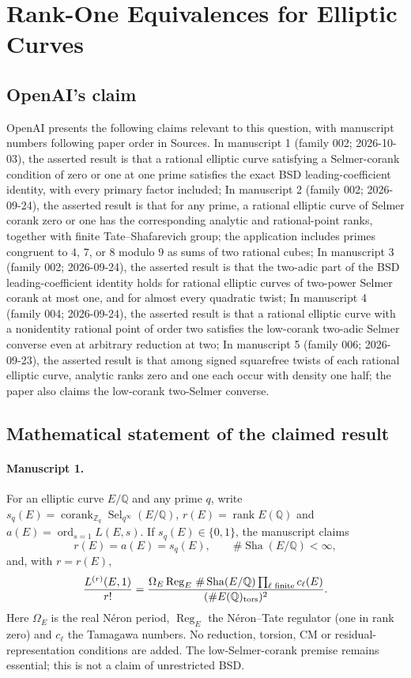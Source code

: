 \documentclass[11pt]{article}
\begin{document}
\section*{Rank-One Equivalences for Elliptic Curves}

\subsection{OpenAI's claim}
OpenAI presents the following claims relevant to this question, with manuscript numbers following paper order in Sources. In manuscript 1 (family 002; 2026-10-03), the asserted result is that a rational elliptic curve satisfying a Selmer-corank condition of zero or one at one prime satisfies the exact BSD leading-coefficient identity, with every primary factor included; In manuscript 2 (family 002; 2026-09-24), the asserted result is that for any prime, a rational elliptic curve of Selmer corank zero or one has the corresponding analytic and rational-point ranks, together with finite Tate--Shafarevich group; the application includes primes congruent to $4$, $7$, or $8$ modulo $9$ as sums of two rational cubes; In manuscript 3 (family 002; 2026-09-24), the asserted result is that the two-adic part of the BSD leading-coefficient identity holds for rational elliptic curves of two-power Selmer corank at most one, and for almost every quadratic twist; In manuscript 4 (family 004; 2026-09-24), the asserted result is that a rational elliptic curve with a nonidentity rational point of order two satisfies the low-corank two-adic Selmer converse even at arbitrary reduction at two; In manuscript 5 (family 006; 2026-09-23), the asserted result is that among signed squarefree twists of each rational elliptic curve, analytic ranks zero and one each occur with density one half; the paper also claims the low-corank two-Selmer converse.

\subsection{Mathematical statement of the claimed result}
\paragraph{Manuscript 1.}
For an elliptic curve $E/\mathbb Q$ and any prime $q$, write $s_q(E)=\operatorname{corank}_{\mathbb Z_q}\operatorname{Sel}_{q^{\infty}}(E/\mathbb Q)$, $r(E)=\operatorname{rank}E(\mathbb Q)$ and $a(E)=\operatorname{ord}_{s=1}L(E,s)$. If $s_q(E)\in\{0,1\}$, the manuscript claims
\[
 r(E)=a(E)=s_q(E),\qquad\#\operatorname{Sha}(E/\mathbb Q)<\infty,
\]
and, with $r=r(E)$,
\[
 \frac{L^{(r)}(E,1)}{r!}
 =\frac{\Omega_E\operatorname{Reg}_E\,\#\operatorname{Sha}(E/\mathbb Q)\prod_{\ell\text{ finite}}c_{\ell}(E)}
 {(\#E(\mathbb Q)_{\rm tors})^2}.
\]
Here $\Omega_E$ is the real N\'eron period, $\operatorname{Reg}_E$ the N\'eron--Tate regulator (one in rank zero) and $c_{\ell}$ the Tamagawa numbers. No reduction, torsion, CM or residual-representation conditions are added. The low-Selmer-corank premise remains essential; this is not a claim of unrestricted BSD.
\end{document}
